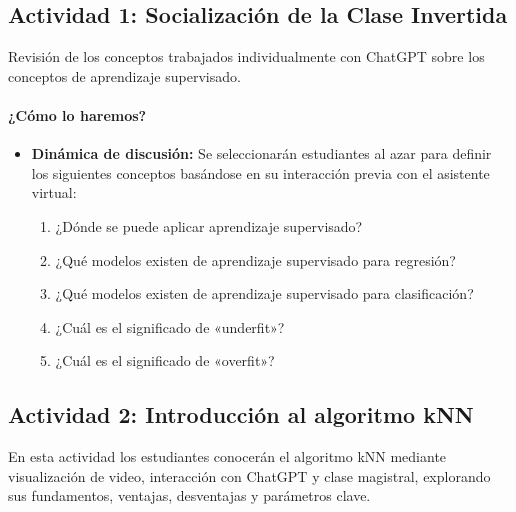 \documentclass[a4,11pt]{aleph-notas}
\begin{document}
\subsection*{Actividad 1: Socialización de la Clase Invertida}

Revisión de los conceptos trabajados individualmente con ChatGPT sobre los conceptos de aprendizaje supervisado.

\paragraph{¿Cómo lo haremos?}  

\begin{itemize}[leftmargin=*]
\item \textbf{Dinámica de discusión:}  
Se seleccionarán estudiantes al azar para definir los siguientes conceptos basándose en su interacción previa con el asistente virtual:
\begin{enumerate}[leftmargin=*]
    \item ¿Dónde se puede aplicar aprendizaje supervisado?
    
    \item ¿Qué modelos existen de aprendizaje supervisado para regresión?
    \item ¿Qué modelos existen de aprendizaje supervisado para clasificación?
    
    \item ¿Cuál es el significado de «underfit»?
    \item ¿Cuál es el significado de «overfit»?
\end{enumerate}
\end{itemize}

\subsection*{Actividad 2: Introducción al algoritmo kNN}

En esta actividad los estudiantes conocerán el algoritmo kNN mediante visualización de video, interacción con ChatGPT y clase magistral, explorando sus fundamentos, ventajas, desventajas y parámetros clave.
\end{document}
